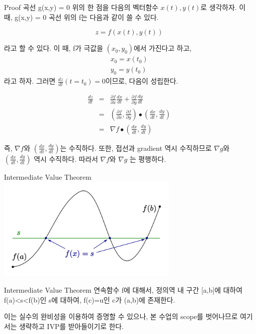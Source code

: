 \documentclass{beamer}
\begin{document}
\begin{frame}[allowframebreaks]{Proof} 
곡선 g(x,y) = 0 위의 한 점을 다음의 벡터함수 $x(t), y(t)$로 생각하자. 이 때, g(x,y) = 0 곡선 위의 f는 다음과 같이 쓸 수 있다. 

\begin{equation} 
z = f(x(t), y(t))
\end{equation}

라고 할 수 있다. 이 때, f가 극값을 $(x_0, y_0)$에서 가진다고 하고, 
\begin{eqnarray}
x_0 = x(t_0) \\ 
y_0 = y(t_0)
\end{eqnarray}
라고 하자.  그러면 $\frac{dz}{dt}(t=t_0) = 0$이므로, 다음이 성립한다. 

\begin{eqnarray} 
\frac{dz}{dt} &=& \frac{\partial f}{\partial x}\frac{dx}{dt} + \frac{\partial f}{\partial y}\frac{dy}{dt} \\ 
&=& (\frac{\partial f}{\partial x}, \frac{\partial f}{\partial y}) \bullet (\frac{dx}{dt}, \frac{dy}{dt}) \\
&=& \nabla f \bullet (\frac{dx}{dt}, \frac{dy}{dt})
\end{eqnarray}

즉, $\nabla f$와 $(\frac{dx}{dt}, \frac{dy}{dt})$는 수직하다. 또한, 접선과 gradient 역시 수직하므로 $\nabla g$와 $(\frac{dx}{dt}, \frac{dy}{dt})$ 역시 수직하다. 따라서 $\nabla f$와 $\nabla g$ 는 평행하다. 
\end{frame}

\begin{frame}{Intermediate Value Theorem} 
\includegraphics[height=5cm,keepaspectratio]{ivp}
\begin{block}{Intermediate Value Theorem} 
연속함수 f에 대해서, 정의역 내 구간 [a,b]에 대하여 f(a)<s<f(b)인 s에 대하여, f(c)=u인 c가 (a,b)에 존재한다. 
\end{block}

이는 실수의 완비성을 이용하여 증명할 수 있으나, 본 수업의 scope를 벗어나므로 여기서는 생략하고 IVP를 받아들이기로 한다. 

\end{frame}
\end{document}
